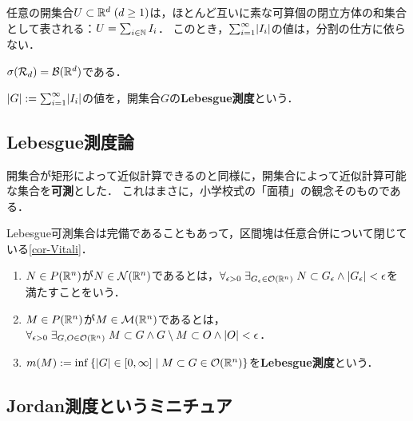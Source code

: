 \documentclass[uplatex, dvipdfmx]{jsreport}
\begin{document}
\begin{proposition}
    任意の開集合$U\subset\mathbb{R}^d\;(d\ge 1)$は，ほとんど互いに素な可算個の閉立方体の和集合として表される：$U=\sum_{i\in\mathbb{N}}I_i$．
    このとき，$\sum^\infty_{i=1}\lvert I_i\rvert$の値は，分割の仕方に依らない．
\end{proposition}

\begin{corollary}\label{cor-Borel-subsets-of-Euclidean-spaces}
    $\sigma(\mathcal{R}_d)=\mathcal{B}(\mathbb{R}^d)$である．
\end{corollary}

\begin{definition}
    $\lvert G\rvert:=\sum^\infty_{i=1}\lvert I_i\rvert$の値を，開集合$G$の\textbf{Lebesgue測度}という．
\end{definition}

\subsection{Lebesgue測度論}

\begin{tcolorbox}[colframe=ForestGreen, colback=ForestGreen!10!white,breakable,colbacktitle=ForestGreen!40!white,coltitle=black,fonttitle=\bfseries\sffamily,
title=]
    開集合が矩形によって近似計算できるのと同様に，開集合によって近似計算可能な集合を\textbf{可測}とした．
    これはまさに，小学校式の「面積」の観念そのものである．

    Lebesgue可測集合は完備であることもあって，区間塊は任意合併について閉じている\ref{cor-Vitali}．
\end{tcolorbox}

\begin{definition}\mbox{}
    \begin{enumerate}
        \item $N\in P(\mathbb{R}^n)$が$N\in\mathcal{N}(\mathbb{R}^n)$であるとは，$\forall_{\epsilon>0}\;\exists_{G_\epsilon\in\mathcal{O}(\mathbb{R}^n)}\;N\subset G_\epsilon\land\lvert G_\epsilon\rvert<\epsilon$を満たすことをいう．
        \item $M\in P(\mathbb{R}^n)$が$M\in\mathcal{M}(\mathbb{R}^n)$であるとは，$\forall_{\epsilon>0}\;\exists_{G,O\in\mathcal{O}(\mathbb{R}^n)}\;M\subset G\land G\setminus M\subset O\land \lvert O\rvert<\epsilon$．
        \item $m(M):=\inf\left\{\lvert G\rvert\in[0,\infty]\mid M\subset G\in\mathcal{O}(\mathbb{R}^n)\right\}$を\textbf{Lebesgue測度}という．
    \end{enumerate}
\end{definition}

\subsection{Jordan測度というミニチュア}
\end{document}
